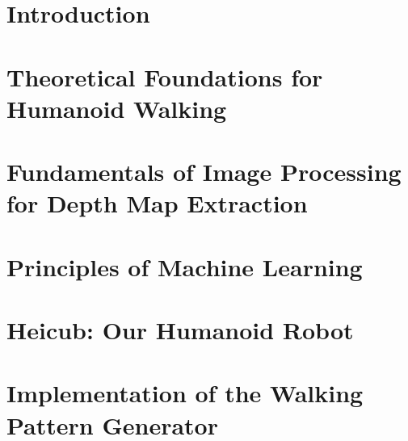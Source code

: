 \documentclass  [
paper    = a4,
BCOR     = 10mm,
twoside,
fontsize = 12pt,
toc      = bibnumbered,
toc      = listofnumbered,
numbers  = noendperiod,
headings = normal,
listof   = leveldown,
version  = 3.03
]                                       {scrreprt}
\begin{document}
	
	
	\tableofcontents
	
	\chapter{Introduction}
	
	
	\chapter{Theoretical Foundations for Humanoid Walking}

	\chapter{Fundamentals of Image Processing for Depth Map Extraction}
	
	\chapter{Principles of Machine Learning}

	\chapter{Heicub: Our Humanoid Robot}
	

	\chapter{Implementation of the Walking Pattern Generator}
	
	
	
	
\end{document}
